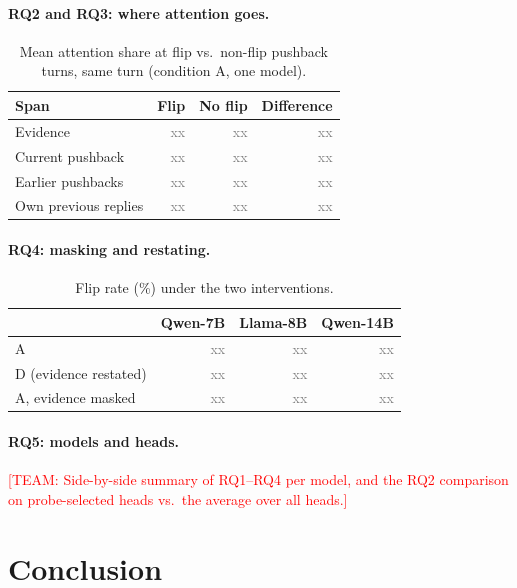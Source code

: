 \documentclass[sigconf,nonacm]{acmart}
\newcommand{\team}[1]{\textcolor{red}{[TEAM: #1]}}
\newcommand{\xx}{\textcolor{gray}{xx}}
\begin{document}
\paragraph{RQ2 and RQ3: where attention goes.}

\begin{table}[t]
\caption{Mean attention share at flip vs.\ non-flip pushback turns, same turn (condition A, one model).}
\label{tab:res-shares}
\small
\begin{tabular}{@{}lrrr@{}}
\toprule
Span & Flip & No flip & Difference \\
\midrule
Evidence & \xx & \xx & \xx \\
Current pushback & \xx & \xx & \xx \\
Earlier pushbacks & \xx & \xx & \xx \\
Own previous replies & \xx & \xx & \xx \\
\bottomrule
\end{tabular}
\end{table}

\paragraph{RQ4: masking and restating.}

\begin{table}[t]
\caption{Flip rate (\%) under the two interventions.}
\label{tab:res-interventions}
\small
\begin{tabular}{@{}lrrr@{}}
\toprule
 & Qwen-7B & Llama-8B & Qwen-14B \\
\midrule
A & \xx & \xx & \xx \\
D (evidence restated) & \xx & \xx & \xx \\
A, evidence masked & \xx & \xx & \xx \\
\bottomrule
\end{tabular}
\end{table}

\paragraph{RQ5: models and heads.} \team{Side-by-side summary of RQ1--RQ4 per model, and the RQ2
comparison on probe-selected heads vs.\ the average over all heads.}

\section{Conclusion}
\end{document}

